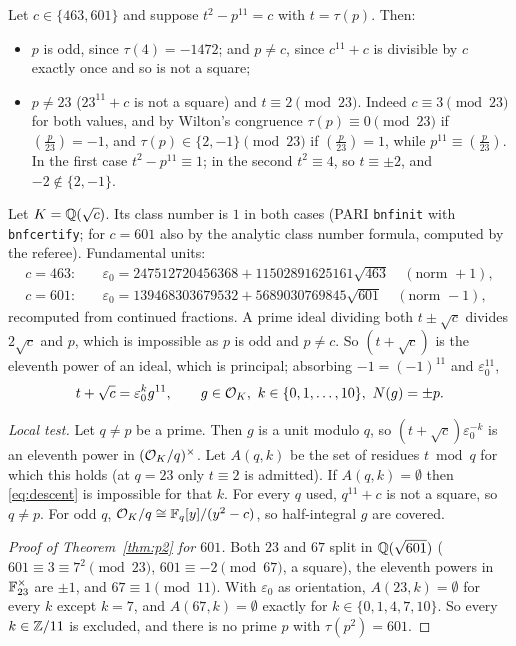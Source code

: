 Let $c\in\{463,601\}$ and suppose $t^2-p^{11}=c$ with $t=\tau(p)$. Then:
\begin{itemize}
\item $p$ is odd, since $\tau(4)=-1472$; and $p\ne c$, since $c^{11}+c$ is divisible by $c$ exactly once and so is not a square;
\item $p\ne23$ ($23^{11}+c$ is not a square) and $t\equiv2\pmod{23}$. Indeed $c\equiv3\pmod{23}$ for both values, and by Wilton's congruence \cite{SwD} $\tau(p)\equiv0\pmod{23}$ if $(\frac p{23})=-1$, and $\tau(p)\in\{2,-1\}\pmod{23}$ if $(\frac p{23})=1$, while $p^{11}\equiv(\frac p{23})$. In the first case $t^2-p^{11}\equiv1$; in the second $t^2\equiv4$, so $t\equiv\pm2$, and $-2\notin\{2,-1\}$.
\end{itemize}
Let $K=\mathbb Q(\sqrt c)$. Its class number is $1$ in both cases (PARI \texttt{bnfinit} with \texttt{bnfcertify}; for $c=601$ also by the analytic class number formula, computed by the referee). Fundamental units:
\begin{align*}
c=463:&\quad\varepsilon_0=247512720456368+11502891625161\sqrt{463}\quad(\text{norm }+1),\\
c=601:&\quad\varepsilon_0=139468303679532+5689030769845\sqrt{601}\quad(\text{norm }-1),
\end{align*}
recomputed from continued fractions. A prime ideal dividing both $t\pm\sqrt c$ divides $2\sqrt c$ and $p$, which is impossible as $p$ is odd and $p\ne c$. So $(t+\sqrt c)$ is the eleventh power of an ideal, which is principal; absorbing $-1=(-1)^{11}$ and $\varepsilon_0^{11}$,
\begin{equation}\label{eq:descent}
t+\sqrt c=\varepsilon_0^kg^{11},\qquad g\in\cO_K,\ k\in\{0,1,\dots,10\},\ N(g)=\pm p .
\end{equation}

\emph{Local test.} Let $q\ne p$ be a prime. Then $g$ is a unit modulo $q$, so $(t+\sqrt c)\varepsilon_0^{-k}$ is an eleventh power in $(\mathcal O_K/q)^\times$. Let $A(q,k)$ be the set of residues $t\bmod q$ for which this holds (at $q=23$ only $t\equiv2$ is admitted). If $A(q,k)=\emptyset$ then \eqref{eq:descent} is impossible for that $k$. For every $q$ used, $q^{11}+c$ is not a square, so $q\ne p$. For odd $q$, $\mathcal O_K/q\cong\mathbb F_q[y]/(y^2-c)$, so half-integral $g$ are covered.

\begin{proof}[Proof of Theorem~\ref{thm:p2} for $601$]
Both $23$ and $67$ split in $\mathbb Q(\sqrt{601})$ ($601\equiv3\equiv7^2\pmod{23}$, $601\equiv-2\pmod{67}$, a square), the eleventh powers in $\mathbb F_{23}^\times$ are $\pm1$, and $67\equiv1\pmod{11}$. With $\varepsilon_0$ as orientation, $A(23,k)=\emptyset$ for every $k$ except $k=7$, and $A(67,k)=\emptyset$ exactly for $k\in\{0,1,4,7,10\}$. So every $k\in\mathbb Z/11$ is excluded, and there is no prime $p$ with $\tau(p^2)=601$.
\end{proof}

